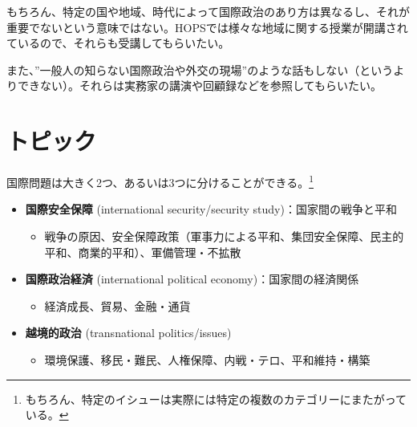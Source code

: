 \documentclass[
  xelatex,
  ja=standard]{bxjsarticle}
\providecommand{\tightlist}{%
  \setlength{\itemsep}{0pt}\setlength{\parskip}{0pt}}\usepackage{longtable,booktabs,array}
\begin{document}
\begin{tcolorbox}[enhanced jigsaw, rightrule=.15mm, leftrule=.75mm, breakable, bottomtitle=1mm, toprule=.15mm, toptitle=1mm, titlerule=0mm, title=\textcolor{quarto-callout-warning-color}{\faExclamationTriangle}\hspace{0.5em}{地域研究や歴史研究}, arc=.35mm, colbacktitle=quarto-callout-warning-color!10!white, opacityback=0, coltitle=black, bottomrule=.15mm, colframe=quarto-callout-warning-color-frame, colback=white, opacitybacktitle=0.6, left=2mm]

もちろん、特定の国や地域、時代によって国際政治のあり方は異なるし、それが重要でないという意味ではない。HOPSでは様々な地域に関する授業が開講されているので、それらも受講してもらいたい。

また、''一般人の知らない国際政治や外交の現場''のような話もしない（というよりできない）。それらは実務家の講演や回顧録などを参照してもらいたい。

\end{tcolorbox}

\hypertarget{ux30c8ux30d4ux30c3ux30af}{%
\section{トピック}\label{ux30c8ux30d4ux30c3ux30af}}

国際問題は大きく2つ、あるいは3つに分けることができる。\footnote{もちろん、特定のイシューは実際には特定の複数のカテゴリーにまたがっている。}

\begin{itemize}
\tightlist
\item
  \textbf{国際安全保障} (international security/security
  study)：国家間の戦争と平和

  \begin{itemize}
  \tightlist
  \item
    戦争の原因、安全保障政策（軍事力による平和、集団安全保障、民主的平和、商業的平和）、軍備管理・不拡散
  \end{itemize}
\item
  \textbf{国際政治経済} (international political
  economy)：国家間の経済関係

  \begin{itemize}
  \tightlist
  \item
    経済成長、貿易、金融・通貨
  \end{itemize}
\item
  \textbf{越境的政治} (transnational politics/issues)

  \begin{itemize}
  \tightlist
  \item
    環境保護、移民・難民、人権保障、内戦・テロ、平和維持・構築
  \end{itemize}
\end{itemize}
\end{document}
